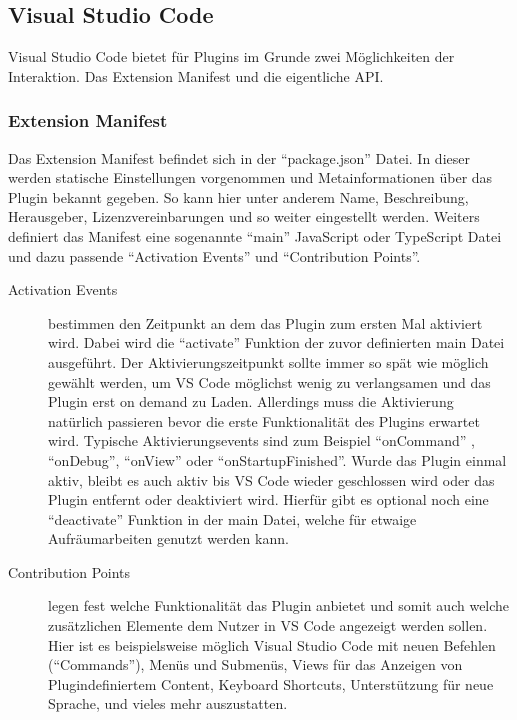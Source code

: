 \subsection{Visual Studio Code}

Visual Studio Code bietet für Plugins im Grunde zwei Möglichkeiten der 
Interaktion. Das Extension Manifest und die eigentliche API.
\subsubsection{Extension Manifest} 
  Das Extension Manifest befindet sich in der \enquote{package.json} 
  Datei. In dieser werden statische Einstellungen vorgenommen und
  Metainformationen über das Plugin bekannt gegeben. So kann hier unter
  anderem Name, Beschreibung, Herausgeber, Lizenzvereinbarungen und
  so weiter eingestellt werden. Weiters definiert das Manifest eine sogenannte
  \enquote{main} JavaScript oder TypeScript Datei und dazu passende
  \enquote{Activation Events} und \enquote{Contribution Points}.
  \begin{description}
    \item[Activation Events] bestimmen den Zeitpunkt an dem das Plugin zum ersten Mal
      aktiviert wird. Dabei wird die \enquote{activate} Funktion der zuvor definierten
      main Datei ausgeführt. Der Aktivierungszeitpunkt sollte immer so spät wie
      möglich gewählt werden, um VS Code möglichst wenig zu verlangsamen und
      das Plugin erst on demand zu Laden. Allerdings
      muss die Aktivierung natürlich passieren bevor die erste Funktionalität des
      Plugins erwartet wird. Typische Aktivierungsevents sind zum Beispiel \enquote{onCommand}
      , \enquote{onDebug}, \enquote{onView} oder \enquote{onStartupFinished}.
      Wurde das Plugin einmal aktiv, bleibt es auch aktiv bis VS Code wieder geschlossen
      wird oder das Plugin entfernt oder deaktiviert wird. Hierfür gibt es optional
      noch eine \enquote{deactivate} Funktion in der main Datei, welche für etwaige
      Aufräumarbeiten genutzt werden kann.
    \item[Contribution Points] legen fest welche Funktionalität das Plugin anbietet
      und somit auch welche zusätzlichen Elemente dem Nutzer in VS Code angezeigt werden sollen. %
      Hier ist es beispielsweise möglich Visual Studio Code mit neuen Befehlen (\enquote{Commands}),
      Menüs und Submenüs, Views für das Anzeigen von Plugindefiniertem Content,
      Keyboard Shortcuts, Unterstützung für neue Sprache, und vieles mehr auszustatten.
  \end{description}
